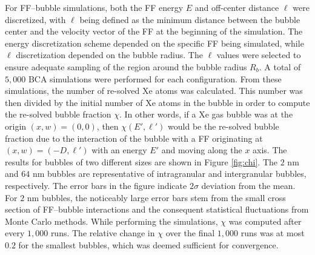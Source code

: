 \documentclass[review]{elsarticle}
\begin{document}
For FF--bubble simulations,
both the FF energy $E$ and off-center distance $\ell$ were discretized,
with $\ell$ being defined as the minimum distance between
the bubble center and the velocity vector of the FF
at the beginning of the simulation.
The energy discretization scheme depended on the specific FF being simulated,
while $\ell$ discretization depended on the bubble radius.
The $\ell$ values were selected to ensure
adequate sampling of the region around the bubble radius $R_b$.
A total of $5,000$ BCA simulations were performed for each configuration.
From these simulations, the number of re-solved Xe atoms was calculated.
This number was then divided by the initial number of Xe atoms in the bubble
in order to compute the re-solved bubble fraction $\chi$.
In other words, if a Xe gas bubble was at the origin $(x, w) = (0, 0)$,
then $\chi(E', \ell')$ would be the re-solved bubble fraction
due to the interaction of the bubble with a FF
originating at $(x, w) = (-D, \ell')$ with an energy $E'$
and moving along the $x$ axis.
The results for bubbles of two different sizes
are shown in Figure \ref{fig:chi}.
The $2$ nm and $64$ nm bubbles are representative
of intragranular and intergranular bubbles, respectively.
The error bars in the figure indicate $2 \sigma$ deviation from the mean.
For $2$ nm bubbles, the noticeably large error bars stem from
the small cross section of FF--bubble interactions
and the consequent statistical fluctuations from Monte Carlo methods.
While performing the simulations,
$\chi$ was computed after every $1,000$ runs.
The relative change in $\chi$ over the final $1,000$ runs
was at most $0.2$ for the smallest bubbles,
which was deemed sufficient for convergence.
\end{document}
